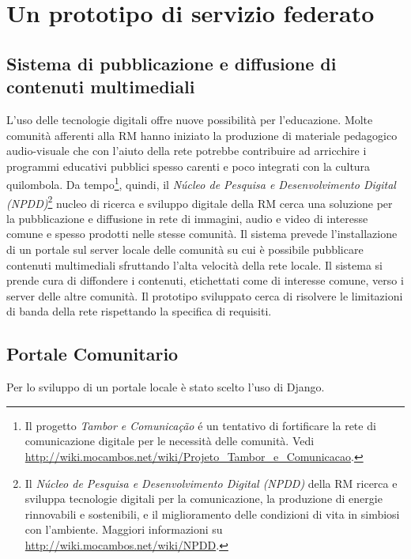 
\chapter{Un prototipo di servizio federato}
\label{Capitolo3}

\section{Sistema di pubblicazione e diffusione di contenuti
  multimediali}
L'uso delle tecnologie digitali offre nuove possibilità per
l'educazione. Molte comunità afferenti alla RM hanno iniziato la
produzione di materiale pedagogico audio-visuale che con l'aiuto della
rete potrebbe contribuire ad arricchire i programmi educativi pubblici
spesso carenti e poco integrati con la cultura quilombola. Da
tempo\footnote{Il progetto \emph{Tambor e Comunicação} é un tentativo
  di fortificare la rete di comunicazione digitale per le necessità
  delle comunità. Vedi
  \url{http://wiki.mocambos.net/wiki/Projeto_Tambor_e_Comunicacao}.},
quindi, il \emph{Núcleo de Pesquisa e Desenvolvimento Digital
  (NPDD)}\footnote{Il \emph{Núcleo de Pesquisa e Desenvolvimento
    Digital (NPDD)} della RM ricerca e sviluppa tecnologie digitali
  per la comunicazione, la produzione di energie rinnovabili e
  sostenibili, e il miglioramento delle condizioni di vita in simbiosi
  con l'ambiente. Maggiori informazioni su
  \url{http://wiki.mocambos.net/wiki/NPDD}.} nucleo di ricerca e
sviluppo digitale della RM cerca una soluzione per la pubblicazione e
diffusione in rete di immagini, audio e video di interesse comune e
spesso prodotti nelle stesse comunità. Il sistema prevede
l'installazione di un portale sul server locale delle comunità su cui
è possibile pubblicare contenuti multimediali sfruttando l'alta
velocità della rete locale. Il sistema si prende cura di diffondere i
contenuti, etichettati come di interesse comune, verso i server delle
altre comunità. Il prototipo sviluppato cerca di risolvere le
limitazioni di banda della rete rispettando la specifica di requisiti.

\section{Portale Comunitario}
Per lo sviluppo di un portale locale è stato scelto l'uso di Django.


